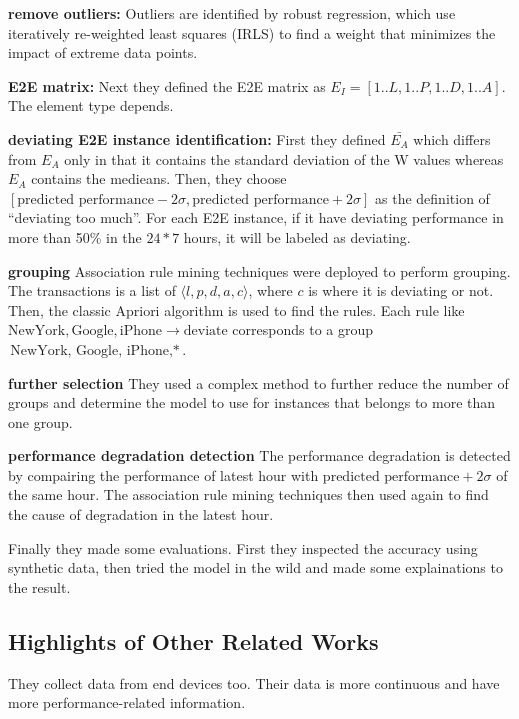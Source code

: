 \documentclass{manuscript}
\begin{document}
    \textbf{remove outliers:} Outliers are identified by robust regression, which use iteratively re-weighted least squares
    (IRLS) to find a weight that minimizes the impact of extreme data points.

    \textbf{E2E matrix:} Next they defined the E2E matrix as $E_I = [1..L, 1..P, 1..D, 1..A]$. The element type depends.

    \textbf{deviating E2E instance identification:} First they defined $\bar{E_A}$ which differs from $E_A$ only in that
    it contains the standard deviation of the W values whereas $E_A$ contains the medieans. Then, they choose
    $[\text{predicted performance} - 2\sigma, \text{predicted performance} + 2\sigma]$ as the definition of
    ``deviating too much''. For each E2E instance, if it have deviating performance in more than 50\% in the $24*7$ hours,
    it will be labeled as deviating.

    \textbf{grouping} Association rule mining techniques were deployed to perform grouping. The transactions is a list of
    $\langle l, p, d, a, c \rangle$, where $c$ is where it is deviating or not. Then, the classic Apriori algorithm is
    used to find the rules. Each rule like $\text{NewYork}, \text{Google}, \text{iPhone} \rightarrow \text{deviate}$
    corresponds to a group $\text{NewYork, Google, iPhone,} \ast$.

    \textbf{further selection} They used a complex method to further reduce the number of groups and determine the model
    to use for instances that belongs to more than one group.

    \textbf{performance degradation detection} The performance degradation is detected by compairing the performance of
    latest hour with $\text{predicted performance} + 2\sigma$ of the same hour. The association rule mining techniques
    then used again to find the cause of degradation in the latest hour.

    Finally they made some evaluations. First they inspected the accuracy using synthetic data, then tried the model in
    the wild and made some explainations to the result.

    \subsection{Highlights of Other Related Works}

    \cite{hutchison_mobile_2014} They collect data from end devices too. Their data is more continuous and have more
    performance-related information.
\end{document}
